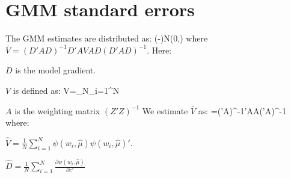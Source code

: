 \documentclass[a4paper, 12pt]{article}
\begin{document}
\section{GMM standard errors}
The GMM estimates are distributed as:
\beqns
{}(\hat\mu-\mu)\rightarrow N(0,)
\eeqns
where $\bar{V}=(D'AD)^{-1}D'AVAD(D'AD)^{-1}$. Here:
\bitem
	\item $D$ is the model gradient.
	\item $V$ is defined as:
	\beqns
		V=\lim_{N\rightarrow\infty}\sum_{i=1}^N
	\eeqns
	\item $A$ is the weighting matrix $(Z'Z)^{-1}$
\eitem
We estimate $\bar{V}$ as:
\beqns
	=('A)^{-1}'AA('A)^{-1}
\eeqns
where:
\bitem 
	\item $\hat{V}=\frac{1}{{N}}\sum_{i=1}^N\psi(w_i,\hat{\mu})\psi(w_i,\hat{\mu})'$.
	\item $\hat{D}=\frac{1}{N}\sum_{i=1}^{N}\frac{\partial \psi(w_i,\hat{\mu})}{\partial c'}$
\eitem
\end{document}

